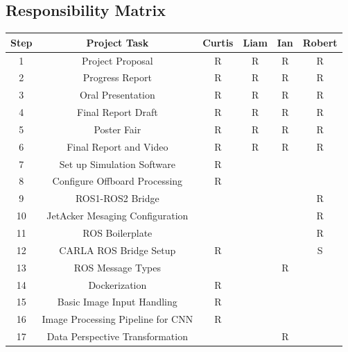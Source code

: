 \documentclass[titlepage,draft]{article}
\begin{document}
\subsection{Responsibility Matrix}
\begin{table}[H]
	\centering
	\begin{tabular}{|c | c | c | c | c | c |}
		\hline
		Step & Project Task                         & Curtis & Liam & Ian & Robert \\ [0.5ex]
		\hline
		1    & Project Proposal                     & R      & R    & R   & R      \\
		\hline
		2    & Progress Report                      & R      & R    & R   & R      \\
		\hline
		3    & Oral Presentation                    & R      & R    & R   & R      \\
		\hline
		4    & Final Report Draft                   & R      & R    & R   & R      \\
		\hline
		5    & Poster Fair                          & R      & R    & R   & R      \\
		\hline
		6    & Final Report and Video               & R      & R    & R   & R      \\
		\hline
		7    & Set up Simulation Software           & R      &      &     &        \\
		\hline
		8    & Configure Offboard Processing        & R      &      &     &        \\
		\hline
		9    & ROS1-ROS2 Bridge                     &        &      &     & R      \\
		\hline
		10   & JetAcker Mesaging Configuration      &        &      &     & R      \\
		\hline
		11   & ROS Boilerplate                      &        &      &     & R      \\
		\hline
		12   & CARLA ROS Bridge Setup               & R      &      &     & S      \\
		\hline
		13   & ROS Message Types                    &        &      & R   &        \\
		\hline
		14   & Dockerization                        & R      &      &     &        \\
		\hline
		15   & Basic Image Input Handling           & R      &      &     &        \\
		\hline
		16   & Image Processing Pipeline for CNN    & R      &      &     &        \\
		\hline
		17   & Data Perspective Transformation      &        &      & R   &        \\

\end{tabular}
\end{table}
\end{document}
